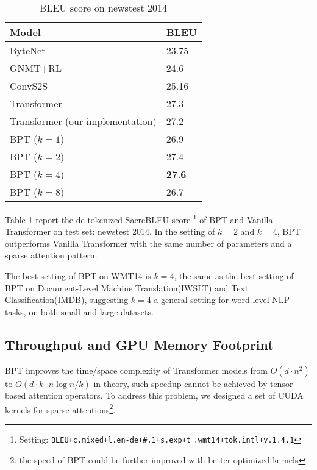 \documentclass[11pt,a4paper]{article}
\begin{document}
\begin{table}[!htb]
\small
\centering
\begin{tabular}{ll}
\toprule
Model                         & BLEU  \\
\midrule
ByteNet~\cite{kalchbrenner2016neural}                       & 23.75 \\
GNMT+RL~\cite{wu2016google}                       & 24.6  \\
ConvS2S~\cite{GehringAGYD17}                     & 25.16 \\
Transformer~\cite{vaswani2017attention}       & 27.3  \\
\midrule
Transformer (our implementation) & 27.2 \\
BPT ($k=1$) & 26.9 \\
BPT ($k=2$) & 27.4 \\
BPT ($k=4$) & \textbf{27.6} \\
BPT ($k=8$) & 26.7 \\
\bottomrule
\end{tabular}
\caption{BLEU score on newstest 2014}
\label{tbl:wmt}
\end{table}

Table \ref{tbl:wmt} report the de-tokenized SacreBLEU score \footnote{Setting: \lstinline[basicstyle=\ttfamily]{BLEU+c.mixed+l.en-de+#.1+s.exp+t}
\lstinline[basicstyle=\ttfamily]{.wmt14+tok.intl+v.1.4.1}} \cite{post-2018-call} of BPT and Vanilla Transformer on test set: newstest 2014. In the setting of $k=2$ and $k=4$, BPT outperforms Vanilla Transformer with the same number of parameters and a sparse attention pattern.

The best setting of BPT on WMT14 is $k=4$, the same as the best setting of BPT on Document-Level Machine Translation(IWSLT) and Text Classification(IMDB), suggesting $k=4$ a general setting for word-level NLP tasks, on both small and large datasets.

\subsection{Throughput and GPU Memory Footprint}

\label{sec:mem}

BPT improves the time/space complexity of Transformer models from $O(d\cdot n^2)$ to $O(d\cdot k\cdot n\log n/k)$ in theory, such speedup cannot be achieved by tensor-based attention operators. To address this problem, we designed a set of CUDA kernels for sparse attentions\footnote{the speed of BPT could be further improved with better optimized kernels}.
\end{document}
